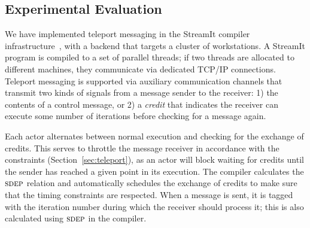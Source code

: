 \subsection{Experimental Evaluation}
\label{sec:evaluation}

We have implemented teleport messaging in the StreamIt compiler
infrastructure~\cite{streamit-asplos}, with a backend that targets a
cluster of workstations.  A StreamIt program is compiled to a set of
parallel threads; if two threads are allocated to different machines,
they communicate via dedicated TCP/IP connections.  Teleport messaging
is supported via auxiliary communication channels that transmit two
kinds of signals from a message sender to the receiver: 1) the contents of
a control message, or 2) a {\it credit} that indicates the receiver
can execute some number of iterations before checking for a message
again.

Each actor alternates between normal execution and checking for the
exchange of credits.  This serves to throttle the message receiver in
accordance with the constraints (Section~\ref{sec:teleport}), as an
actor will block waiting for credits until the sender has reached a
given point in its execution.  The compiler calculates the $\textsc{sdep}$
relation and automatically schedules the exchange of credits to make
sure that the timing constraints are respected.  When a message is
sent, it is tagged with the iteration number during which the receiver
should process it; this is also calculated using $\textsc{sdep}$ in the
compiler.



